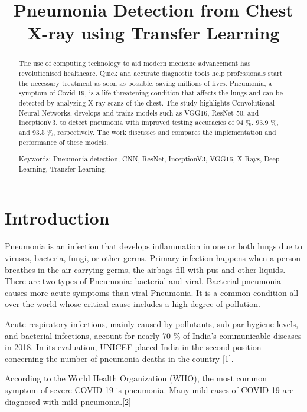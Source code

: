 \documentclass[conference]{IEEEtran}
\title{Pneumonia Detection from Chest X-ray using Transfer Learning}
\author{
\IEEEauthorblockN{ Sharvari Kalgutkar , Vansh Jain , Gokul Nair , Kaustubh Venkatesh , Kshitij Parab , Amol Deshpande , Dayanand\\ Ambawade}
\IEEEauthorblockA{Department of Electronics and Telecommunications\\
Sardar Patel Institute of Technology\\
Mumbai-58, Maharashtra, India
}
}
\begin{document}
\maketitle
\thispagestyle{empty}
\pagestyle{empty}


\begin{abstract}

The use of computing technology to aid modern medicine advancement has revolutionised healthcare. Quick and accurate diagnostic tools help professionals start the necessary treatment as soon as possible, saving millions of lives. Pneumonia, a symptom of Covid-19, is a life-threatening condition that affects the lungs and can be detected by analyzing X-ray scans of the chest. The study highlights Convolutional Neural Networks, develops and trains models such as VGG16, ResNet-50, and InceptionV3, to detect pneumonia with improved testing accuracies of 94 \%, 93.9 \%, and 93.5 \%, respectively. The work discusses and compares the implementation and performance of these models.


Keywords:  Pneumonia detection, CNN, ResNet, InceptionV3, VGG16, X-Rays, Deep Learning, Transfer Learning.

\end{abstract}


\section{Introduction}

Pneumonia is an infection that develops inflammation in one or both lungs due to viruses, bacteria, fungi, or other germs. Primary infection happens when a person breathes in the air carrying germs, the airbags fill with pus and other liquids. There are two types of Pneumonia: bacterial and viral. Bacterial pneumonia causes more acute symptoms than viral Pneumonia. It is a common condition all over the world whose critical cause includes a high degree of pollution.

Acute respiratory infections, mainly caused by pollutants, sub-par hygiene levels, and bacterial infections, account for nearly 70 \% of India’s communicable diseases in 2018. In its evaluation, UNICEF placed India in the second position concerning the number of pneumonia deaths in the country [1].

According to the World Health Organization (WHO), the most common symptom of severe COVID-19 is pneumonia. Many mild cases of COVID-19 are diagnosed with mild pneumonia.[2]
\end{document}

